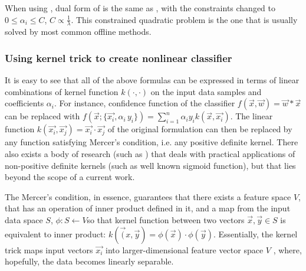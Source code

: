 When using , dual form of  is the same as , with the constraints changed to $0 \le \alpha_i \le C$, $C \propto \frac{1}{\lambda}$. This constrained quadratic problem is the one that is usually solved by most common offline methods.

\subsubsection{Using kernel trick to create nonlinear classifier}

It is easy to see that all of the above formulas can be expressed in terms of linear combinations of kernel function $k(\cdot,\cdot)$ on the input data samples and coefficients $\alpha_i$. For instance, confidence function of the classifier $f(\vec{x},\vec{w})=\vec{w}*\vec{x}$  can be replaced with $f(\vec{x};\{\vec{x_i},\alpha_i\,y_i\})=\sum_{i=1}^{n}\alpha_i y_i k(\vec{x},\vec{x_i})$. The linear function $k(\vec{x_i},\vec{x_j})=\vec{x_i}\cdot \vec{x_j}$ of the original formulation can then be replaced by any function satisfying Mercer's condition, i.e. any positive definite kernel. There also exists a body of research (such as \cite{negative}) that deals with practical applications of non-positive definite kernels (such as well known sigmoid function), but that lies beyond the scope of a current work. 

 The Mercer's condition, in essence, guarantees that there exists a feature space $V$, that has an operation of inner product defined in it,  and a map from the input data space $S$, $\phi : S \leftarrow V$so that kernel function between two vectors $\vec{x},\vec{y} \in S$ is equivalent to inner product: $k(\vec({x},\vec{y})=\phi(\vec{x})\cdot \phi(\vec{y})$. Essentially, the kernel trick maps input vectors $\vec{x_i}$ into larger-dimensional feature vector space $V$ , where, hopefully, the data becomes linearly separable.

